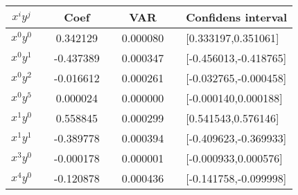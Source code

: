 \begin{center}
\label{tab:lasso-var-conf}
\begin{tabularx}{\textwidth}{c X c X c X l}
    \hline
    \hline
        $x^iy^j$ && Coef && VAR && Confidens interval\\
    \hline
        $x^0y^0$ && 0.342129   && 0.000080   && [0.333197,0.351061] \\
        $x^0y^1$ && -0.437389  && 0.000347   && [-0.456013,-0.418765] \\
        $x^0y^2$ && -0.016612  && 0.000261   && [-0.032765,-0.000458] \\
        $x^0y^5$ && 0.000024   && 0.000000   && [-0.000140,0.000188] \\
        $x^1y^0$ && 0.558845   && 0.000299   && [0.541543,0.576146] \\
        $x^1y^1$ && -0.389778  && 0.000394   && [-0.409623,-0.369933] \\
        $x^3y^0$ && -0.000178  && 0.000001   && [-0.000933,0.000576] \\
        $x^4y^0$ && -0.120878  && 0.000436   && [-0.141758,-0.099998] \\
    \hline
\end{tabularx}
\end{center}


